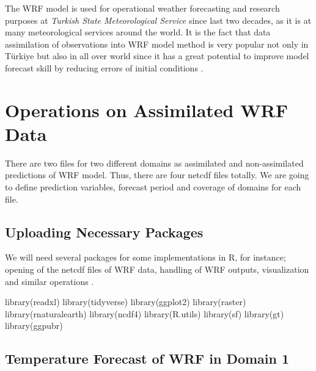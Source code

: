 \documentclass[
  letterpaper,
  DIV=11,
  numbers=noendperiod,
  abstract]{scrartcl}
\newenvironment{Shaded}{\begin{snugshade}}{\end{snugshade}}
\newcommand{\FunctionTok}[1]{\textcolor[rgb]{0.28,0.35,0.67}{#1}}
\newcommand{\NormalTok}[1]{\textcolor[rgb]{0.00,0.23,0.31}{#1}}
\begin{document}
The WRF model is used for operational weather forecasting and research
purposes at \emph{Turkish State Meteorological Service} since last two
decades, as it is at many meteorological services around the world. It
is the fact that data assimilation of observations into WRF model method
is very popular not only in Türkiye but also in all over world since it
has a great potential to improve model forecast skill by reducing errors
of initial conditions \autocite{yucel2014,yucel2015,bao2015,cheng2017}.

\hypertarget{operations-on-assimilated-wrf-data}{%
\section{Operations on Assimilated WRF
Data}\label{operations-on-assimilated-wrf-data}}

There are two files for two different domains as assimilated and
non-assimilated predictions of WRF model. Thus, there are four netcdf
files totally. We are going to define prediction variables, forecast
period and coverage of domains for each file.

\hypertarget{uploading-necessary-packages}{%
\subsection{Uploading Necessary
Packages}\label{uploading-necessary-packages}}

We will need several packages for some implementations in R, for
instance; opening of the netcdf files of WRF data, handling of WRF
outputs, visualization and similar operations
\autocite{readxl,tidyverse,ggplot2-2,ggpubr-2,raster,rnaturalearth,ncdf4,R.utils,sf,gt}.

\begin{Shaded}
\begin{Highlighting}[]
\FunctionTok{library}\NormalTok{(readxl)}
\FunctionTok{library}\NormalTok{(tidyverse)}
\FunctionTok{library}\NormalTok{(ggplot2)}
\FunctionTok{library}\NormalTok{(raster)}
\FunctionTok{library}\NormalTok{(rnaturalearth)}
\FunctionTok{library}\NormalTok{(ncdf4)}
\FunctionTok{library}\NormalTok{(R.utils)}
\FunctionTok{library}\NormalTok{(sf)}
\FunctionTok{library}\NormalTok{(gt)}
\FunctionTok{library}\NormalTok{(ggpubr)}
\end{Highlighting}
\end{Shaded}

\hypertarget{temperature-forecast-of-wrf-in-domain-1}{%
\subsection{Temperature Forecast of WRF in Domain
1}\label{temperature-forecast-of-wrf-in-domain-1}}
\end{document}

